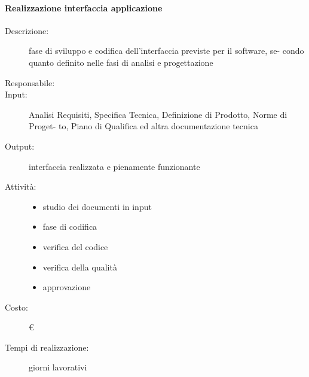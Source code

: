 \paragraph{Realizzazione interfaccia applicazione}
\begin{description}
\item[Descrizione:] fase di sviluppo e codifica dell'interfaccia previste per il software, se-
condo quanto definito nelle fasi di analisi e progettazione 

\item[Responsabile:] 

\item[Input:] Analisi Requisiti, Specifica Tecnica, Definizione di Prodotto, Norme di Proget-
to, Piano di Qualifica ed altra documentazione tecnica 

\item[Output:] interfaccia realizzata e pienamente funzionante

\item[Attività:]
\begin{itemize}
\item studio dei documenti in input
\item fase di codifica
\item verifica del codice
\item verifica della qualità
\item approvazione
\end{itemize}
\item[Costo:] \euro 
\item[Tempi di realizzazione:]  giorni lavorativi
\end{description}



